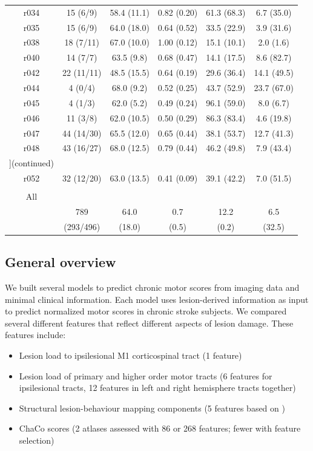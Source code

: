 \documentclass[phd,tocprelim]{cornell}
\renewcommand{\caption}[1]{\singlespacing\hangcaption{#1}\normalspacing}
\begin{document}
\begin{longtable}{c|c|c|c|c|c}
r034 & 15 (6/9) & 58.4 (11.1) & 0.82 (0.20) & 61.3 (68.3) & 6.7 (35.0)  \\
r035 & 15 (6/9) & 64.0 (18.0) & 0.64 (0.52) & 33.5 (22.9) & 3.9 (31.6)  \\
r038 & 18 (7/11) & 67.0 (10.0) & 1.00 (0.12) & 15.1 (10.1) & 2.0 (1.6)  \\
r040 & 14 (7/7) & 63.5 (9.8) & 0.68 (0.47) & 14.1 (17.5) & 8.6 (82.7)  \\
r042 & 22 (11/11) & 48.5 (15.5) & 0.64 (0.19) & 29.6 (36.4) & 14.1 (49.5)  \\
r044 & 4 (0/4) & 68.0 (9.2) & 0.52 (0.25) & 43.7 (52.9) & 23.7 (67.0)  \\
r045 & 4 (1/3) & 62.0 (5.2) & 0.49 (0.24) & 96.1 (59.0) & 8.0 (6.7)  \\
r046 & 11 (3/8) & 62.0 (10.5) & 0.50 (0.29) & 86.3 (83.4) & 4.6 (19.8)  \\
r047 & 44 (14/30) & 65.5 (12.0) & 0.65 (0.44) & 38.1 (53.7) & 12.7 (41.3)  \\
r048 & 43 (16/27) & 68.0 (12.5) & 0.79 (0.44) & 46.2 (49.8) & 7.9 (43.4)  \\
 \caption[]{(continued)}\\

r052 & 32 (12/20) & 63.0 (13.5) & 0.41 (0.09) & 39.1 (42.2) & 7.0 (51.5)  \\

   & & & & & \\
 All  & & & & & \\
\hline\hline
& 789  & 64.0 & 0.7 & 12.2 & 6.5 \\
&(293/496) &(18.0) & (0.5) &(0.2) &  (32.5)  \\

\bottomrule
\end{longtable}

\doublespacing

\subsection{General overview}

We built several models to predict chronic motor scores from imaging data and minimal clinical information. Each model uses lesion-derived information as input to predict normalized motor scores in chronic stroke subjects. We compared several different features that reflect different aspects of lesion damage. These features include:

\begin{itemize}
\item Lesion load to ipsilesional M1 corticospinal tract (1 feature)
\item Lesion load of primary and higher order motor tracts (6 features for ipsilesional tracts, 12 features in left and right hemisphere tracts together)
\item Structural lesion-behaviour mapping components (5 features based on \cite{Bowren2022-rs})
\item ChaCo scores (2 atlases assessed with 86 or 268 features; fewer with feature selection)
\end{itemize}
\end{document}
